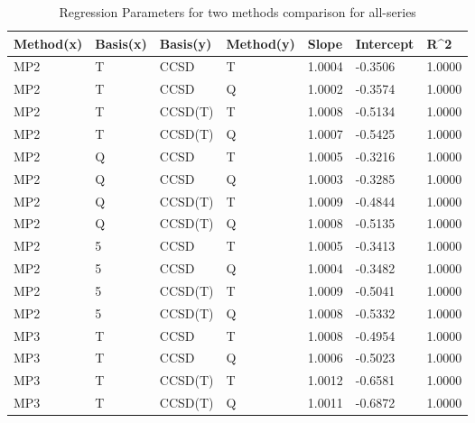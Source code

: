 \begin{table}
  \caption{Regression Parameters for two methods comparison for all-series}
  \label{tbl:regression-two-all}
  \begin{tabular}{l l l l l l l }
    \hline
    Method(x) & Basis(x) & Basis(y) & Method(y) & Slope & Intercept & R^2 \\ 
    \hline
    MP2 & T & CCSD & T & 1.0004 & -0.3506 & 1.0000 \\ 
    MP2 & T & CCSD & Q & 1.0002 & -0.3574 & 1.0000 \\ 
    MP2 & T & CCSD(T) & T & 1.0008 & -0.5134 & 1.0000 \\ 
    MP2 & T & CCSD(T) & Q & 1.0007 & -0.5425 & 1.0000 \\ 
    MP2 & Q & CCSD & T & 1.0005 & -0.3216 & 1.0000 \\ 
    MP2 & Q & CCSD & Q & 1.0003 & -0.3285 & 1.0000 \\ 
    MP2 & Q & CCSD(T) & T & 1.0009 & -0.4844 & 1.0000 \\ 
    MP2 & Q & CCSD(T) & Q & 1.0008 & -0.5135 & 1.0000 \\ 
    MP2 & 5 & CCSD & T & 1.0005 & -0.3413 & 1.0000 \\ 
    MP2 & 5 & CCSD & Q & 1.0004 & -0.3482 & 1.0000 \\ 
    MP2 & 5 & CCSD(T) & T & 1.0009 & -0.5041 & 1.0000 \\ 
    MP2 & 5 & CCSD(T) & Q & 1.0008 & -0.5332 & 1.0000 \\ 
    MP3 & T & CCSD & T & 1.0008 & -0.4954 & 1.0000 \\ 
    MP3 & T & CCSD & Q & 1.0006 & -0.5023 & 1.0000 \\ 
    MP3 & T & CCSD(T) & T & 1.0012 & -0.6581 & 1.0000 \\ 
    MP3 & T & CCSD(T) & Q & 1.0011 & -0.6872 & 1.0000 \\ 
    \hline
  \end{tabular}
\end{table}
